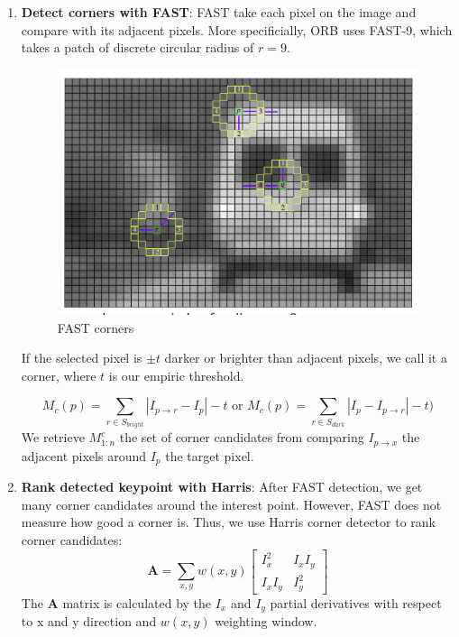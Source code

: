 \documentclass[a4paper]{report}
\numberwithin{figure}{section}
\begin{document}
\begin{enumerate}
  \item \textbf{Detect corners with FAST}: FAST take each pixel on 
    the image and compare with its adjacent pixels. More specificially, 
    ORB uses FAST-9, which takes a patch of discrete circular radius of $r=9$. 

    \begin{figure}[H]
	\centering
  \includegraphics[width=0.6\linewidth,natwidth=640,natheight=640]
  {fig/ref_imgs/fast.png}
  \caption{FAST corners}
  \label{fig:fast_corners}
\end{figure}

    If the 
    selected pixel is $\pm t$ darker or brighter than adjacent pixels, 
    we call it a corner, where $t$ is our empiric threshold.

\begin{equation}
  M_c(p) = 
  \sum_{r \in S_{bright}} |I_{p \rightarrow r} - I_p| - t \text{ or } 
  M_c(p) = 
  \sum_{r \in S_{dark}} |I_p - I_{p \rightarrow r}| - t)
\end{equation}
    We retrieve $M^c_{1:n}$ the set of corner candidates from 
    comparing $I_{p\rightarrow x}$ the adjacent pixels around $I_p$ the target pixel.

  \item \textbf{Rank detected keypoint with Harris}: After FAST detection, 
    we get many corner candidates around the interest point. However, 
    FAST does not measure how good a corner is. Thus, we use Harris corner 
    detector to rank corner candidates:
    \begin{equation}
      \mathbf{A} = \sum_{x,y} w(x,y) 
      \begin{bmatrix}
        I_x^2 & I_xI_y \\ I_xI_y & I_y^2
      \end{bmatrix}
    \end{equation}
    The $\mathbf{A}$ matrix is calculated by the $I_x$ and $I_y$ partial 
    derivatives with respect to x and y direction and $w(x,y)$ weighting window.


\end{enumerate}
\end{document}
